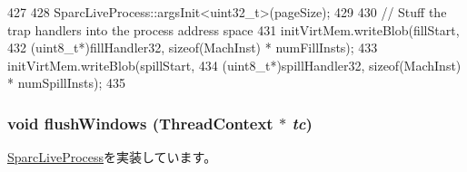 \begin{DoxyCode}
427 {
428     SparcLiveProcess::argsInit<uint32_t>(pageSize);
429 
430     // Stuff the trap handlers into the process address space
431     initVirtMem.writeBlob(fillStart,
432             (uint8_t*)fillHandler32, sizeof(MachInst) * numFillInsts);
433     initVirtMem.writeBlob(spillStart,
434             (uint8_t*)spillHandler32, sizeof(MachInst) *  numSpillInsts);
435 }
\end{DoxyCode}
\hypertarget{classSparc32LiveProcess_ac36137c98f2b65736e0c5745c3c90c85}{
\subsubsection[{flushWindows}]{\setlength{\rightskip}{0pt plus 5cm}void flushWindows ({\bf ThreadContext} $\ast$ {\em tc})}}
\label{classSparc32LiveProcess_ac36137c98f2b65736e0c5745c3c90c85}


\hyperlink{classSparcLiveProcess_ab39e13308fa993d443b20e56572106f5}{SparcLiveProcess}を実装しています。


